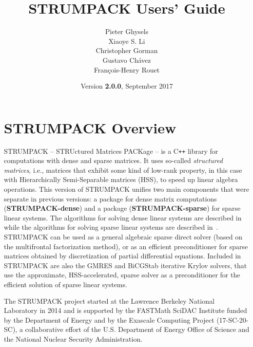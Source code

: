 \documentclass{article}
\title{\textbf{STRUMPACK Users' Guide}}
\author{Pieter Ghysels\footnotemark[1] \\
  Xiaoye S. Li\footnotemark[1] \\
  Christopher Gorman\footnotemark[2] \\
  Gustavo Ch\'{a}vez\footnotemark[1] \\
  Fran\c{c}ois-Henry Rouet\footnotemark[3]}
\date{Version \textbf{2.0.0}, September 2017}
\begin{document}
\maketitle

\vfill


\pagebreak

\tableofcontents

\pagebreak
\section{STRUMPACK Overview}
STRUMPACK -- STRUctured Matrices PACKage -- is a C\texttt{++} library
for computations with dense and sparse matrices. It uses so-called
\emph{structured matrices}, i.e., matrices that exhibit some kind of
low-rank property, in this case with Hierarchically Semi-Separable
matrices (HSS), to speed up linear algebra operations.  This version
of STRUMPACK unifies two main components that were separate in
previous versions: a package for dense matrix computations
(\textbf{STRUMPACK-dense}) and a package (\textbf{STRUMPACK-sparse})
for sparse linear systems. The algorithms for solving dense linear
systems are described in~\cite{rouet2014distributed} while the
algorithms for solving sparse linear systems are described
in~\cite{ghysels2015sparse,ghysels2017sparse}. STRUMPACK can be used
as a general algebraic sparse direct solver (based on the multifrontal
factorization method), or as an efficient preconditioner for sparse
matrices obtained by discretization of partial differential
equations. Included in STRUMPACK are also the GMRES and BiCGStab
iterative Krylov solvers, that use the approximate, HSS-accelerated,
sparse solver as a preconditioner for the efficient solution of sparse
linear systems.

The STRUMPACK project started at the Lawrence Berkeley National
Laboratory in 2014 and is supported by the FASTMath SciDAC Institute
funded by the Department of Energy and by the Exascale Computing
Project (17-SC-20-SC), a collaborative effort of the U.S. Department
of Energy Office of Science and the National Nuclear Security
Administration.
\end{document}

